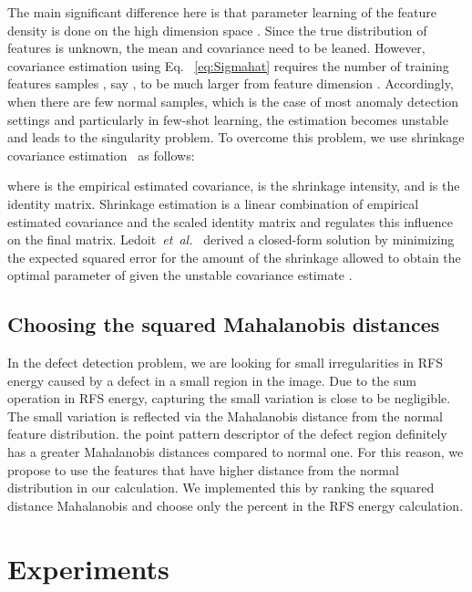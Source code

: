 \documentclass[journal]{IEEEtran}
\newcommand \andothers {\textit{et~al.}}
\begin{document}
The main significant difference here is that parameter learning of the feature density is done on the high dimension space . Since the true distribution of features is unknown, the mean and covariance need to be leaned. However, covariance estimation using Eq. ~\ref{eq:Sigmahat} requires the number of  training features samples , say , to be much larger from feature dimension . Accordingly, when there are few normal samples, which is the case of most anomaly detection settings and particularly in few-shot learning, the estimation becomes unstable and leads to the singularity problem. To overcome this problem, we use shrinkage covariance estimation~\cite{ledoit2004well} as follows:


where  is the empirical estimated covariance,  is the shrinkage intensity, and  is the identity matrix. Shrinkage estimation is a linear combination of empirical estimated covariance  and the scaled identity matrix  and  regulates this influence on the final matrix. Ledoit~\andothers~\cite{ledoit2004well} derived a closed-form solution by minimizing the expected squared error  for the amount of the shrinkage allowed to obtain the optimal parameter of  given the unstable covariance estimate .

\subsection{Choosing the  squared Mahalanobis distances}
In the defect detection problem, we are looking for small irregularities in RFS energy caused by a defect in a small region in the image. Due to the sum operation in RFS energy, capturing the small variation is close to be negligible. The small variation is reflected via the Mahalanobis distance from the normal feature distribution. the point pattern descriptor of the defect region definitely has a greater Mahalanobis distances compared to normal one. For this reason, we propose to use the features that have higher distance from the normal distribution in our calculation. We implemented this by ranking the squared distance Mahalanobis and choose only the  percent in the RFS energy calculation.

\section{Experiments}
\label{Sec:experiments}
\end{document}
